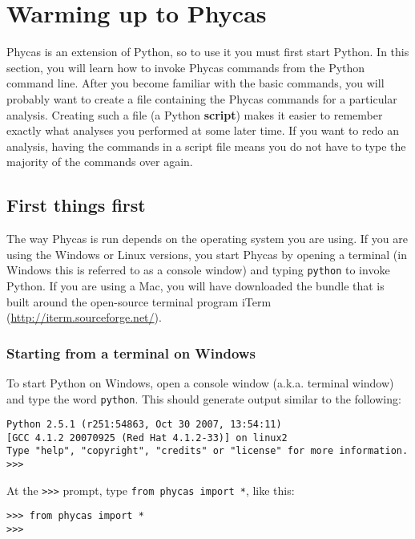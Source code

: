 \documentclass[10pt]{article}
\newcommand{\code}[1]{{\tt #1}}				%
\newcommand{\term}[1]{{\bfseries #1}\index{#1}}		%
\begin{document}
\section{Warming up to Phycas} \label{sec:warmup}

Phycas is an extension of Python, so to use it you must first start Python. In this section, you will learn how to invoke Phycas commands from the Python command line. After you become familiar with the basic commands, you will probably want to create a file containing the Phycas commands for a particular analysis. Creating such a file (a Python \term{script}) makes it easier to remember exactly what analyses you performed at some later time. If you want to redo an analysis, having the commands in a script file means you do not have to type the majority of the commands over again.

\subsection{First things first}
The way Phycas is run depends on the operating system you are using. If you are using the Windows or Linux versions, you start Phycas by opening a terminal (in Windows this is referred to as a console window) and typing \code{python} to invoke Python. If you are using a Mac, you will have downloaded the  bundle that is built around the open-source terminal program iTerm (\url{http://iterm.sourceforge.net/}).
\subsubsection{Starting from a terminal on Windows}
To start Python on Windows, open a console window (a.k.a. terminal window) and type the word \code{python}. This should generate output similar to the following:
\begin{verbatim}
Python 2.5.1 (r251:54863, Oct 30 2007, 13:54:11) 
[GCC 4.1.2 20070925 (Red Hat 4.1.2-33)] on linux2
Type "help", "copyright", "credits" or "license" for more information.
>>> 
\end{verbatim}

At the \code{>>>} prompt, type \code{from phycas import *}, like this:
\begin{verbatim}
>>> from phycas import *
>>>
\end{verbatim}
\end{document}
